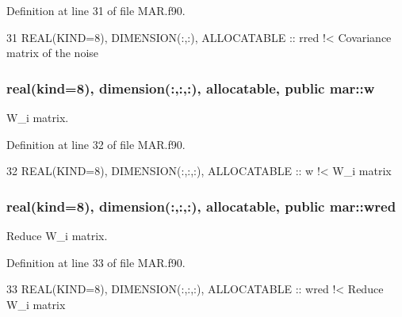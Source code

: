 Definition at line 31 of file M\+A\+R.\+f90.


\begin{DoxyCode}
31   \textcolor{keywordtype}{REAL(KIND=8)}, \textcolor{keywordtype}{DIMENSION(:,:)}, \textcolor{keywordtype}{ALLOCATABLE} :: rred\textcolor{comment}{ !< Covariance matrix of the noise}
\end{DoxyCode}
\subsubsection[{\texorpdfstring{w}{w}}]{\setlength{\rightskip}{0pt plus 5cm}real(kind=8), dimension(\+:,\+:,\+:), allocatable, public mar\+::w}\hypertarget{namespacemar_aed76f863f30ab18ba428596d2157163d}{}\label{namespacemar_aed76f863f30ab18ba428596d2157163d}


W\+\_\+i matrix. 



Definition at line 32 of file M\+A\+R.\+f90.


\begin{DoxyCode}
32   \textcolor{keywordtype}{REAL(KIND=8)}, \textcolor{keywordtype}{DIMENSION(:,:,:)}, \textcolor{keywordtype}{ALLOCATABLE} :: w\textcolor{comment}{ !< W\_i matrix}
\end{DoxyCode}
\subsubsection[{\texorpdfstring{wred}{wred}}]{\setlength{\rightskip}{0pt plus 5cm}real(kind=8), dimension(\+:,\+:,\+:), allocatable, public mar\+::wred}\hypertarget{namespacemar_af8cb3185ff947cb6540a6b33838e23d7}{}\label{namespacemar_af8cb3185ff947cb6540a6b33838e23d7}


Reduce W\+\_\+i matrix. 



Definition at line 33 of file M\+A\+R.\+f90.


\begin{DoxyCode}
33   \textcolor{keywordtype}{REAL(KIND=8)}, \textcolor{keywordtype}{DIMENSION(:,:,:)}, \textcolor{keywordtype}{ALLOCATABLE} :: wred\textcolor{comment}{ !< Reduce W\_i matrix}
\end{DoxyCode}
